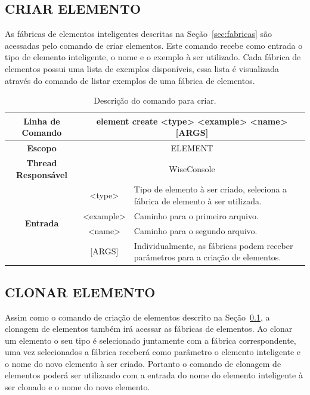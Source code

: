 \subsection{CRIAR ELEMENTO}\label{sec:create_element}

As fábricas de elementos inteligentes descritas na Seção~\ref{sec:fabricas} são acessadas pelo comando de criar elementos. Este comando recebe como entrada o tipo de elemento inteligente, o nome e o exemplo à ser utilizado. Cada fábrica de elementos possui uma lista de exemplos disponíveis, essa lista é visualizada através do comando de listar exemplos de uma fábrica de elementos.

\begin{center}
	\begin{table}[!htbp]
		\begin{tabular}{|c|c|m{}|}
			\hline
			\textbf{Linha de Comando} & \multicolumn{2}{c|}{element create <type> <example> <name> [ARGS]} \\
			\hline
			\textbf{Escopo} & \multicolumn{2}{c|}{ELEMENT} \\
			\hline
			\textbf{Thread Responsável} & \multicolumn{2}{c|}{WiseConsole} \\
			\hline
			\multirow{4}{*}{\textbf{Entrada}} & <type> & Tipo de elemento à ser criado, seleciona a fábrica de elemento à ser utilizada. \\
			
			& <example> & Caminho para o primeiro arquivo. \\
			& <name> & Caminho para o segundo arquivo. \\
			& [ARGS] & Individualmente,  as fábricas podem receber parâmetros para a criação de elementos. \\
			\hline
		\end{tabular}
		\caption{Descrição do comando para criar.}
		\label{tab:create_element}
	\end{table}
\end{center}

\subsection{CLONAR ELEMENTO}\label{sec:clone_element}

Assim como o comando de criação de elementos descrito na Seção~\ref{sec:create_element}, a clonagem de elementos também irá acessar as fábricas de elementos. Ao clonar um elemento o seu tipo é selecionado juntamente com a fábrica correspondente, uma vez selecionados a fábrica receberá como parâmetro o elemento inteligente e o nome do novo elemento à ser criado. Portanto o comando de clonagem de elementos poderá ser utilizando com a entrada do nome do elemento inteligente à ser clonado e o nome do novo elemento.

